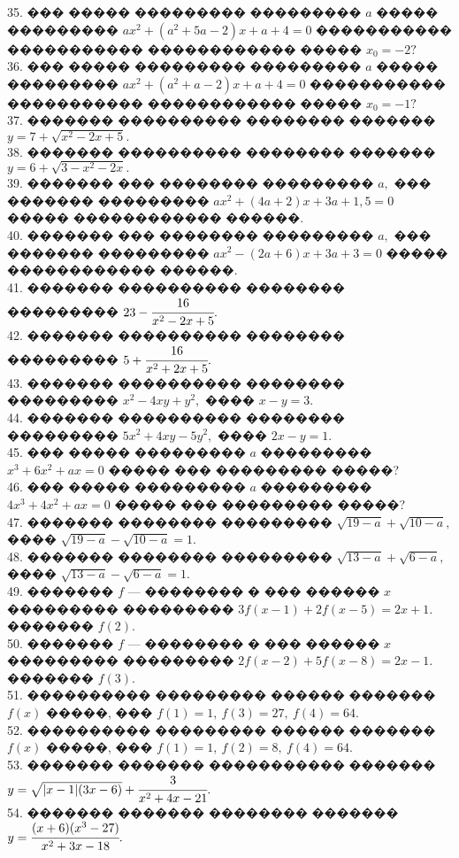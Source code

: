 \documentclass[12pt]{article}
\begin{document}
35. ��� ����� ��������� ��������� $a$ ����� ��������� $ax^2+(a^2+5a-2)x+a+4=0$ ����������� ����������� ������������ ����� $x_0=-2?$\\
36. ��� ����� ��������� ��������� $a$ ����� ��������� $ax^2+(a^2+a-2)x+a+4=0$ ����������� ����������� ������������ ����� $x_0=-1?$\\
37. ������� ���������� �������� ������� $y=7+\sqrt{x^2-2x+5}.$\\
38. ������� ���������� �������� ������� $y=6+\sqrt{3-x^2-2x}.$\\
39. ������� ��� �������� ��������� $a,$ ��� ������� ��������� $ax^2+(4a+2)x+3a+1,5=0$ ����� ������������ ������.\\
40. ������� ��� �������� ��������� $a,$ ��� ������� ��������� $ax^2-(2a+6)x+3a+3=0$ ����� ������������ ������.\\
41. ������� ���������� �������� ��������� $23-\cfrac{16}{x^2-2x+5}.$\\
42. ������� ���������� �������� ��������� $5+\cfrac{16}{x^2+2x+5}.$\\
43. ������� ���������� �������� ��������� $x^2-4xy+y^2,$ ���� $x-y=3.$\\
44. ������� ���������� �������� ��������� $5x^2+4xy-5y^2,$ ���� $2x-y=1.$\\
45. ��� ����� ��������� $a$ ��������� $x^3+6x^2+ax=0$ ����� ��� ��������� �����?\\
46. ��� ����� ��������� $a$ ��������� $4x^3+4x^2+ax=0$ ����� ��� ��������� �����?\\
47. ������� �������� ��������� $\sqrt{19-a}+\sqrt{10-a},$ ���� $\sqrt{19-a}-\sqrt{10-a}=1.$\\
48. ������� �������� ��������� $\sqrt{13-a}+\sqrt{6-a},$ ���� $\sqrt{13-a}-\sqrt{6-a}=1.$\\
49. ������� $f$ --- �������� � ��� ������ $x$ ��������� ��������� $3f(x-1)+2f(x-5)=2x+1.$ ������� $f(2).$\\
50. ������� $f$ --- �������� � ��� ������ $x$ ��������� ��������� $2f(x-2)+5f(x-8)=2x-1.$ ������� $f(3).$\\
51. ���������� ��������� ������ ������� $f(x)$ �����, ��� $f(1)=1,\ f(3)=27,\ f(4)=64.$\\
52. ���������� ��������� ������ ������� $f(x)$ �����, ��� $f(1)=1,\ f(2)=8,\ f(4)=64.$\\
53. ������� ������� ����������� ������� $y=\sqrt{|x-1|(3x-6)}+\cfrac{3}{x^2+4x-21}.$\\
54. ������� ������� �������� ������� $y=\cfrac{(x+6)(x^3-27)}{x^2+3x-18}.$\\
\end{document}
